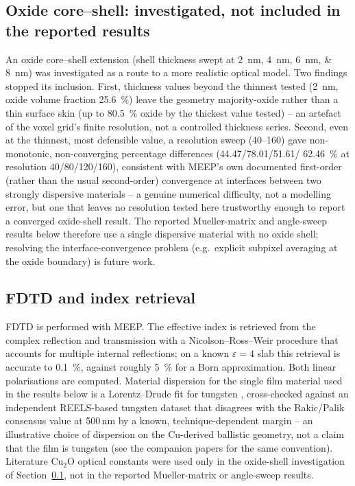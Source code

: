 \documentclass[aip,jcp,amsmath,amssymb,reprint]{revtex4-1}
\begin{document}
\subsection{Oxide core--shell: investigated, not included in the reported results}
\label{ssec:oxide}
An oxide core--shell extension (shell thickness swept at \SIlist{2;4;6;8}{nm})
was investigated as a route to a more realistic optical model. Two findings
stopped its inclusion. First, thickness values beyond the thinnest tested
(\SI{2}{nm}, oxide volume fraction \SI{25.6}{\percent}) leave the geometry
majority-oxide rather than a thin surface skin (up to \SI{80.5}{\percent}
oxide by the thickest value tested) -- an artefact of the voxel grid's finite
resolution, not a controlled thickness series. Second, even at the thinnest,
most defensible value, a resolution sweep (40--160) gave non-monotonic,
non-converging percentage differences (\num{44.47}/\num{78.01}/\num{51.61}/
\SI{62.46}{\percent} at resolution 40/80/120/160), consistent with MEEP's own
documented first-order (rather than the usual second-order) convergence at
interfaces between two strongly dispersive materials -- a genuine numerical
difficulty, not a modelling error, but one that leaves no resolution tested
here trustworthy enough to report a converged oxide-shell result. The reported
Mueller-matrix and angle-sweep results below therefore use a single dispersive
material with no oxide shell; resolving the interface-convergence problem
(e.g.\ explicit subpixel averaging at the oxide boundary) is future work.

\subsection{FDTD and index retrieval}
\label{ssec:dispersion}
FDTD is performed with MEEP. The effective index is retrieved from the complex
reflection and transmission with a Nicolson--Ross--Weir procedure that accounts
for multiple internal reflections; on a known $\varepsilon = 4$ slab this
retrieval is accurate to \SI{0.1}{\percent}, against roughly \SI{5}{\percent}
for a Born approximation. Both linear polarisations are computed. Material
dispersion for the single film material used in the results below is a
Lorentz--Drude fit for tungsten \citep{rakic1998optical}, cross-checked
against an independent REELS-based tungsten dataset
\citep{werner2009optical} that disagrees with the Rakic/Palik consensus
value at 500\,nm by a known, technique-dependent margin -- an illustrative
choice of dispersion on the Cu-derived ballistic geometry, not a claim that
the film is tungsten (see the companion papers for the same convention).
Literature Cu$_2$O optical constants \citep{malerba2011cu2o} were used only
in the oxide-shell investigation of Section~\ref{ssec:oxide}, not in the
reported Mueller-matrix or angle-sweep results.
\end{document}
